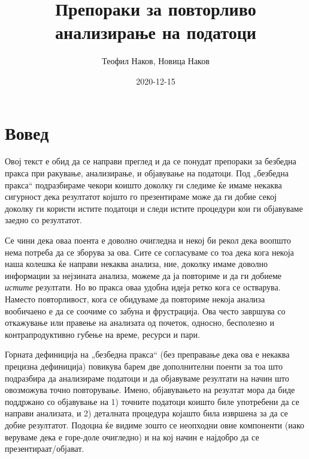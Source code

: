 \documentclass[
]{book}
\title{Препораки за повторливо анализирање на податоци}
\author{Теофил Наков, Новица Наков}
\date{2020-12-15}
\begin{document}
\maketitle

{
\setcounter{tocdepth}{1}
\tableofcontents
}
\hypertarget{intro}{%
\chapter{Вовед}\label{intro}}

Овој текст е обид да се направи преглед и да се понудат препораки за безбедна пракса при ракување, анализирање, и објавување на податоци. Под „безбедна пракса`` подразбираме чекори коишто доколку ги следиме ќе имаме некаква сигурност дека резултатот којшто го презентираме може да ги добие секој доколку ги користи истите податоци и следи истите процедури кои ги објавуваме заедно со резултатот.

Се чини дека оваа поента е доволно очигледна и некој би рекол дека воопшто нема потреба да се зборува за ова. Сите се согласуваме со тоа дека кога некоја наша колешка ќе направи некаква анализа, ние, доколку имаме доволно информации за нејзината анализа, можеме да ја повториме и да ги добиеме \emph{истите} резултати. Но во пракса оваа удобна идеја ретко кога се остварува. Наместо повторливост, кога се обидуваме да повториме некоја анализа вообичаено е да се соочиме со забуна и фрустрација. Ова често завршува со откажување или правење на анализата од почеток, односно, бесполезно и контрапродуктивно губење на време, ресурси и пари.

Горната дефиниција на „безбедна пракса`` (без преправање дека ова е некаква прецизна дефиниција) повикува барем две дополнителни поенти за тоа што подразбира да анализираме податоци и да објавуваме резултати на начин што овозможува точно повторување. Имено, објавувањето на резултат мора да биде поддржано со објавување на 1) точните податоци коишто биле употребени да се направи анализата, и 2) деталната процедура којашто била извршена за да се добие резултатот. Подоцна ќе видиме зошто се неопходни овие компоненти (иако веруваме дека е горе-доле очигледно) и на кој начин е најдобро да се презентираат/објават.
\end{document}
